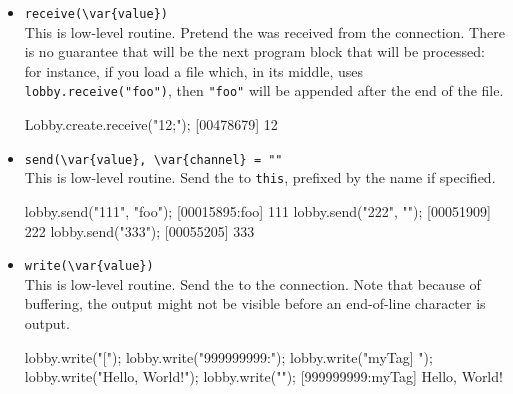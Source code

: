 \begin{itemize}
\item \lstinline|receive(\var{value})|\\
  This is low-level routine.  Pretend the 
   was received from the connection.  There is no guarantee
  that  will be the next program block that will be
  processed: for instance, if you load a file which, in its middle,
  uses \lstinline|lobby.receive("foo")|, then \lstinline|"foo"| will
  be appended after the end of the file.
\begin{urbiscript}[firstnumber=last]
Lobby.create.receive("12;");
[00478679] 12
\end{urbiscript}

\item \lstinline|send(\var{value}, \var{channel} = ""|\\
  This is low-level routine.  Send the  
  to \lstinline|this|, prefixed by the 
   name if specified.
\begin{urbiscript}[firstnumber=last]
lobby.send("111", "foo");
[00015895:foo] 111
lobby.send("222", "");
[00051909] 222
lobby.send("333");
[00055205] 333
\end{urbiscript}

\item \lstinline|write(\var{value})|\\
  This is low-level routine.  Send the  
  to the connection.  Note that because of buffering, the output might
  not be visible before an end-of-line character is output.
\begin{urbiscript}[firstnumber=last]
lobby.write("[");
lobby.write("999999999:");
lobby.write("myTag] ");
lobby.write("Hello, World!");
lobby.write("\n");
[999999999:myTag] Hello, World!
\end{urbiscript}
\end{itemize}

